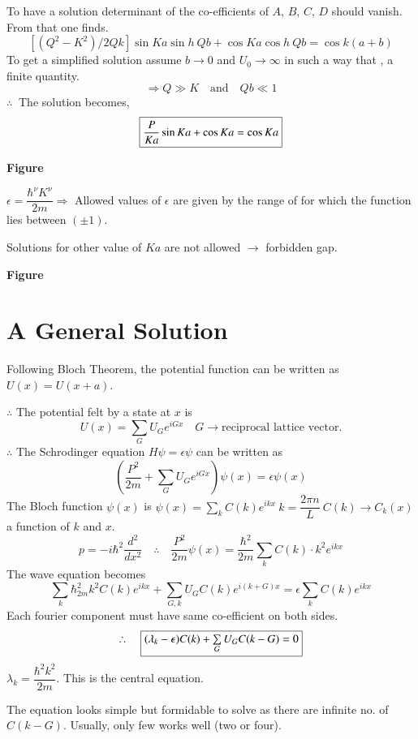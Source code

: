To have a solution determinant of the co-efficients of $A$, $B$, $C$, $D$ should vanish. From that one finds.
$$
[(Q^{2}-K^{2})/2Qk]\sin Ka \sin h \ Qb+\cos Ka \cos h \ Qb = \cos k(a+b)
$$
To get a simplified solution assume $b\to 0$ and $U_{0}\to \infty$ in such a way that , a finite quantity.
$$
\Rightarrow Q\gg K\quad \text{and}\quad Qb\ll 1
$$
$\therefore \ $ The solution becomes,
$$
\fbox{$\dfrac{P}{Ka}\sin Ka + \cos Ka=\cos Ka$}
$$
\begin{center}
{\bf Figure}
\end{center}

$\epsilon = \dfrac{\hbar^{\nu}K^{\nu}}{2m}\Rightarrow$ Allowed values of $\epsilon$ are given by the range of  for which the function lies between $(\pm 1)$.

Solutions for other value of $Ka$ are not allowed $\to$ forbidden gap.
\begin{center}
{\bf Figure}
\end{center}

\section*{A General Solution}

Following Bloch Theorem, the potential function can be written as $U(x)=U(x+a)$.

$\therefore$ The potential felt by a state at $x$ is
$$
U(x)=\sum\limits_{G}U_{G}e^{iGx}\quad G\to \text{reciprocal lattice vector.}
$$
$\therefore$ The Schrodinger equation $H\psi=\epsilon\psi$ can be written as
$$
\left(\dfrac{P^{2}}{2m}+\sum\limits_{G}U_{G}e^{iGx}\right)\psi(x)=\epsilon\psi(x)
$$
The Bloch function $\psi(x)$ is $\psi(x)=\sum\limits_{k}C(k)e^{ikx} \ k=\dfrac{2\pi n}{L} \ C(k)\to C_{k}(x)$ a function of $k$ and $x$.
$$
p=-i\hbar^{2}\dfrac{d^{2}}{dx^{2}}\quad \therefore\quad \dfrac{P^{2}}{2m}\psi(x)=\dfrac{\hbar^{2}}{2m}\sum\limits_{k}C(k)\cdot k^{2}e^{ikx}
$$
The wave equation becomes
$$
\sum\limits_{k}\hbar^{2}_{2m}k^{2}C(k)e^{ikx}+\sum\limits_{G,k}U_{G}C(k)e^{i(k+G)x}=\epsilon \sum\limits_{k}C(k)e^{ikx}
$$
Each fourier component must have same co-efficient on both sides.
$$
\therefore\quad \fbox{$(\lambda_{k}-\epsilon)C(k)+\sum\limits_{G}U_{G}C(k-G)=0$}
$$
$\lambda_{k}=\dfrac{\hbar^{2}k^{2}}{2m}$. This is the central equation.

The equation looks simple but formidable to solve as there are infinite no. of $C(k-G)$. Usually, only few works well (two or four).

